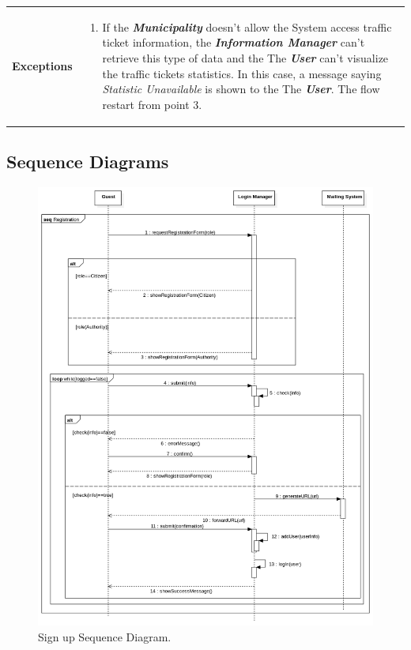 \documentclass{report}
\begin{document}
\begin{tabularx}{\linewidth}{| l | X |}
	\hline
	\textbf{Exceptions} & \parbox{0.7\textwidth}{ \begin{enumerate}
			\item If the \textbf{\textit{Municipality}} doesn't allow the System access traffic ticket information, the \textbf{\textit{Information Manager}} can't retrieve this type of data and the The \textbf{\textit{User}} can't visualize the traffic tickets statistics. In this case, a message saying \textit{Statistic Unavailable} is shown to the The \textbf{\textit{User}}. The flow restart from point 3.  
		\end{enumerate}}\\
	
	\hline
	
\end{tabularx}
\newpage
\subsection{Sequence Diagrams}
\begin{figure}[ht!]
	\begin{center}
	\includegraphics[width=\textwidth]{./img/RegistrationSdd.png}
	\end{center}
	\caption{Sign up Sequence Diagram.}
	\label{fig:SequenceDiagram1}
	\end{figure}
\end{document}
